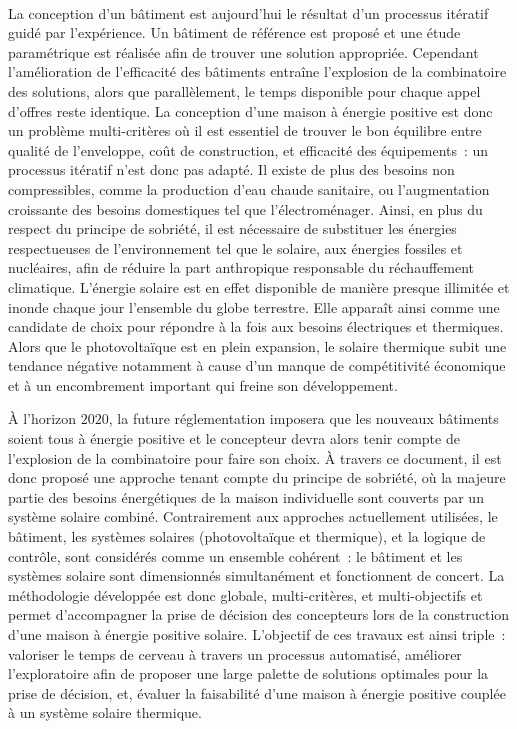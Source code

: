 \paragraph{} %
La conception d’un bâtiment est aujourd’hui le résultat d’un processus itératif guidé par
l’expérience. Un bâtiment de référence est proposé et une étude paramétrique est réalisée
afin de trouver une solution appropriée. Cependant l’amélioration de l’efficacité des
bâtiments entraîne l’explosion de la combinatoire des solutions, alors que parallèlement,
le temps disponible pour chaque appel d’offres reste identique. La conception d’une
maison à énergie positive est donc un problème multi-critères où il est essentiel de
trouver le bon équilibre entre qualité de l’enveloppe, coût de construction, et efficacité
des équipements~: un processus itératif n’est donc pas adapté. Il existe de plus des
besoins non compressibles, comme la production d’eau chaude sanitaire, ou l’augmentation
croissante des besoins domestiques tel que l’électroménager. Ainsi, en plus du respect du
principe de sobriété, il est nécessaire de substituer les énergies respectueuses de
l’environnement tel que le solaire, aux énergies fossiles et nucléaires, afin de réduire la
part anthropique responsable du réchauffement climatique. L’énergie solaire est en effet
disponible de manière presque illimitée et inonde chaque jour l’ensemble du globe
terrestre. Elle apparaît ainsi comme une candidate de choix pour répondre à la fois aux
besoins électriques et thermiques. Alors que le photovoltaïque est en plein expansion, le
solaire thermique subit une tendance négative notamment à cause d’un manque de
compétitivité économique et à un encombrement important qui freine son développement.

À l’horizon $2020$, la future réglementation imposera que les nouveaux bâtiments soient
tous à énergie positive et le concepteur devra alors tenir compte de l’explosion de la
combinatoire pour faire son choix. À travers ce document, il est donc proposé une approche
tenant compte du principe de sobriété, où la majeure partie des besoins énergétiques de la
maison individuelle sont couverts par un système solaire combiné. Contrairement aux
approches actuellement utilisées, le bâtiment, les systèmes solaires (photovoltaïque et
thermique), et la logique de contrôle, sont considérés comme un ensemble cohérent~: le
bâtiment et les systèmes solaire sont dimensionnés simultanément et fonctionnent de
concert. La méthodologie développée est donc globale, multi-critères, et multi-objectifs
et permet d’accompagner la prise de décision des concepteurs lors de la construction d’une
maison à énergie positive solaire. L’objectif de ces travaux est ainsi triple~: valoriser
le temps de cerveau à travers un processus automatisé, améliorer l’exploratoire afin de
proposer une large palette de solutions optimales pour la prise de décision, et, évaluer
la faisabilité d’une maison à énergie positive couplée à un système solaire thermique.


